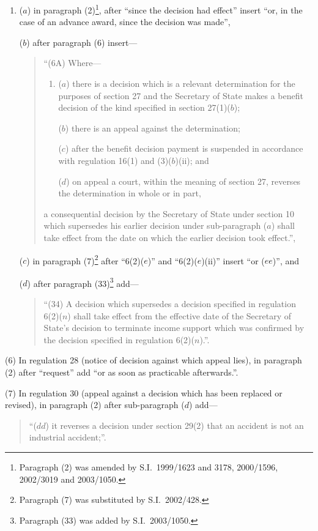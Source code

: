 \documentclass[12pt,a4paper]{article}
\begin{document}
\begin{enumerate}\item[]
($a$) in paragraph (2)\footnote{Paragraph (2) was amended by S.I.\ 1999/1623 and 3178, 2000/1596, 2002/3019 and 2003/1050.}, after “since the decision had effect” insert “or, in the case of an advance award, since the decision was made”,

($b$) after paragraph (6) insert—
\begin{quotation}
“(6A) Where—
\begin{enumerate}\item[]
($a$) there is a decision which is a relevant determination for the purposes of section 27 and the Secretary of State makes a benefit decision of the kind specified in section 27(1)($b$);

($b$) there is an appeal against the determination;

($c$) after the benefit decision payment is suspended in accordance with regulation 16(1) and (3)($b$)(ii); and

($d$) on appeal a court, within the meaning of section 27, reverses the determination in whole or in part,
\end{enumerate}
a consequential decision by the Secretary of State under section 10 which supersedes his earlier decision under sub-paragraph ($a$)  shall take effect from the date on which the earlier decision took effect.”,
\end{quotation}

($c$) in paragraph (7)\footnote{Paragraph (7) was substituted by S.I.\ 2002/428.} after “6(2)($e$)” and “6(2)($e$)(ii)” insert “or ($ee$)”, and

($d$) after paragraph (33)\footnote{Paragraph (33) was added by S.I.\ 2003/1050.} add—
\begin{quotation}
“(34) A decision which supersedes a decision specified in regulation 6(2)($n$)  shall take effect from the effective date of the Secretary of State’s decision to terminate income support which was confirmed by the decision specified in regulation 6(2)($n$).”.
\end{quotation}
\end{enumerate}

(6) In regulation 28 (notice of decision against which appeal lies), in paragraph (2) after “request” add “or as soon as practicable afterwards.”.

(7) In regulation 30 (appeal against a decision which has been replaced or revised), in paragraph (2) after sub-paragraph ($d$)  add—
\begin{quotation}
“($dd$) it reverses a decision under section 29(2) that an accident is not an industrial accident;”.
\end{quotation}
\end{document}
